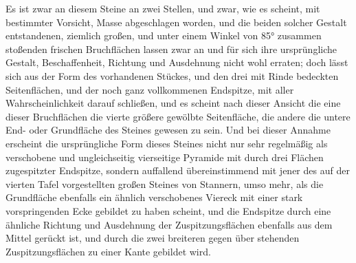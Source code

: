 \documentclass[a4paper, 11pt, oneside, german]{article}
\begin{document}
Es ist zwar an diesem Steine an zwei Stellen, und zwar, wie es scheint, mit bestimmter Vorsicht, Masse abgeschlagen worden, und die beiden solcher Gestalt entstandenen, ziemlich großen, und unter einem Winkel von 85° zusammen stoßenden frischen Bruchflächen lassen zwar an und für sich ihre ursprüngliche Gestalt, Beschaffenheit, Richtung und Ausdehnung nicht wohl erraten; doch lässt sich aus der Form des vorhandenen Stückes, und den drei mit Rinde bedeckten Seitenflächen, und der noch ganz vollkommenen Endspitze, mit aller Wahrscheinlichkeit darauf schließen, und es scheint nach dieser Ansicht die eine dieser Bruchflächen die vierte größere gewölbte Seitenfläche, die andere die untere End- oder Grundfläche des Steines gewesen zu sein. Und bei dieser Annahme erscheint die ursprüngliche Form dieses Steines nicht nur sehr regelmäßig als verschobene und ungleichseitig vierseitige Pyramide mit durch drei Flächen zugespitzter Endspitze, sondern auffallend übereinstimmend mit jener des auf der vierten Tafel vorgestellten großen Steines von Stannern, umso mehr, als die Grundfläche ebenfalls ein ähnlich verschobenes Viereck mit einer stark vorspringenden Ecke gebildet zu haben scheint, und die Endspitze durch eine ähnliche Richtung und Ausdehnung der Zuspitzungsflächen ebenfalls aus dem Mittel gerückt ist, und durch die zwei breiteren gegen über stehenden Zuspitzungsflächen zu einer Kante gebildet wird.
\end{document}
